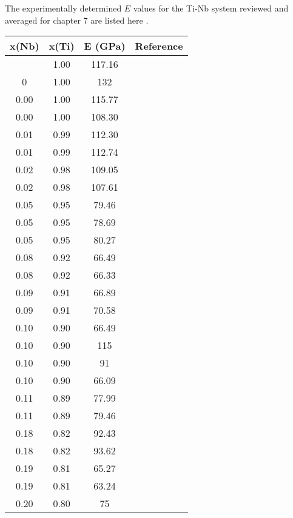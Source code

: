 The experimentally determined $E$ values for the Ti-Nb system reviewed and averaged for chapter 7 are listed here \cite{Timoshevskii2011,Friak2012,Karre2015,Ozaki2004}.
\noindent 
\begin{longtable}[H]{ c c c c }
	\hline
	x(Nb) & x(Ti) & E (GPa) & Reference \\
	\hline
	\endhead
	\hline
	\endfoot
	 0.00 & 1.00 & 117.16 & \cite{Timoshevskii2011}\\
	 0 & 1.00 & 132 & \cite{Friak2012}\\
	 0.00 & 1.00 & 115.77 & \cite{Ozaki2004}\\
	 0.00 & 1.00 & 108.30 & \cite{Karre2015}\\
	 0.01 & 0.99 & 112.30 & \cite{Timoshevskii2011}\\
	 0.01 & 0.99 & 112.74 & \cite{Ozaki2004}\\
	 0.02 & 0.98 & 109.05 & \cite{Timoshevskii2011}\\
	 0.02 & 0.98 & 107.61 & \cite{Ozaki2004}\\
	 0.05 & 0.95 & 79.46 & \cite{Timoshevskii2011}\\
	 0.05 & 0.95 & 78.69 & \cite{Ozaki2004}\\
	 0.05 & 0.95 & 80.27 & \cite{Timoshevskii2011}\\
	 0.08 & 0.92 & 66.49 & \cite{Timoshevskii2011}\\
	 0.08 & 0.92 & 66.33 & \cite{Ozaki2004}\\
	 0.09 & 0.91 & 66.89 & \cite{Timoshevskii2011}\\
	 0.09 & 0.91 & 70.58 & \cite{Karre2015}\\
	 0.10 & 0.90 & 66.49 & \cite{Timoshevskii2011}\\
	 0.10 & 0.90 & 115 & \cite{Friak2012}\\
	 0.10 & 0.90 & 91 & \cite{Friak2012}\\
	 0.10 & 0.90 & 66.09 & \cite{Ozaki2004}\\
	 0.11 & 0.89 & 77.99 & \cite{Ozaki2004}\\
	 0.11 & 0.89 & 79.46 & \cite{Timoshevskii2011}\\
	 0.18 & 0.82 & 92.43 & \cite{Timoshevskii2011}\\
	 0.18 & 0.82 & 93.62 & \cite{Ozaki2004}\\
	 0.19 & 0.81 & 65.27 & \cite{Timoshevskii2011}\\
	 0.19 & 0.81 & 63.24 & \cite{Timoshevskii2011}\\
	 0.20 & 0.80 & 75 & \cite{Friak2012}\\

\end{longtable}
